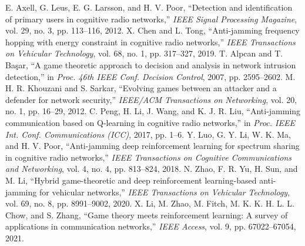 \documentclass[conference]{IEEEtran}
\begin{document}
\begin{thebibliography}{1}
 E. Axell, G. Leus, E. G. Larsson, and H. V. Poor, ``Detection and identification of primary users in cognitive radio networks,'' \emph{IEEE Signal Processing Magazine}, vol. 29, no. 3, pp. 113--116, 2012.
 X. Chen and L. Tong, ``Anti-jamming frequency hopping with energy constraint in cognitive radio networks,'' \emph{IEEE Transactions on Vehicular Technology}, vol. 68, no. 1, pp. 317--327, 2019.
 T. Alpcan and T. Ba\c{s}ar, ``A game theoretic approach to decision and analysis in network intrusion detection,'' in \emph{Proc. 46th IEEE Conf. Decision Control}, 2007, pp. 2595--2602.
 M. H. R. Khouzani and S. Sarkar, ``Evolving games between an attacker and a defender for network security,'' \emph{IEEE/ACM Transactions on Networking}, vol. 20, no. 1, pp. 16--29, 2012.
 C. Peng, H. Li, J. Wang, and K. J. R. Liu, ``Anti-jamming communication based on Q-learning in cognitive radio networks,'' in \emph{Proc. IEEE Int. Conf. Communications (ICC)}, 2017, pp. 1--6.
 Y. Luo, G. Y. Li, W. K. Ma, and H. V. Poor, ``Anti-jamming deep reinforcement learning for spectrum sharing in cognitive radio networks,'' \emph{IEEE Transactions on Cognitive Communications and Networking}, vol. 4, no. 4, pp. 813--824, 2018.
 N. Zhao, F. R. Yu, H. Sun, and M. Li, ``Hybrid game-theoretic and deep reinforcement learning-based anti-jamming for vehicular networks,'' \emph{IEEE Transactions on Vehicular Technology}, vol. 69, no. 8, pp. 8991--9002, 2020.
 X. Li, M. Zhao, M. Fitch, M. K. K. H. L. L. Chow, and S. Zhang, ``Game theory meets reinforcement learning: A survey of applications in communication networks,'' \emph{IEEE Access}, vol. 9, pp. 67022--67054, 2021.
\end{thebibliography}
\end{document}

